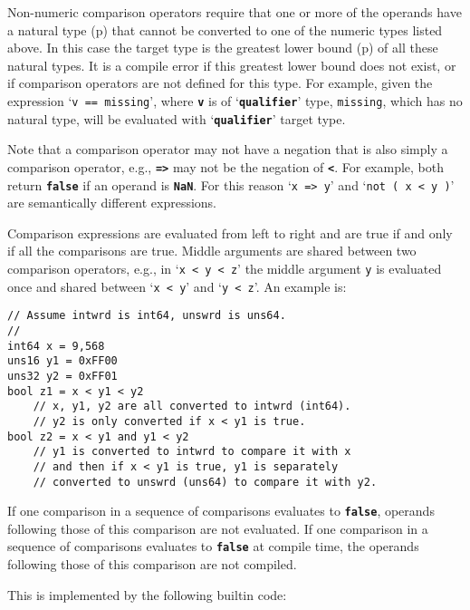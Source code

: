 \documentclass[12pt]{article}
\newcommand{\TT}[1]{{\tt \bfseries #1}}
\newcommand{\pagref}[1]{p\pageref{#1}}
\newenvironment{indpar}[1][0.3in]%
	{\begin{list}{}%
		     {\setlength{\itemsep}{0in}%
		      \setlength{\topsep}{0in}%
		      \setlength{\parsep}{1ex}%
		      \setlength{\labelwidth}{#1}%
		      \setlength{\leftmargin}{#1}%
		      \addtolength{\leftmargin}{\labelsep}}%
	 \item}%
	{\end{list}}
\begin{document}
Non-numeric comparison operators require that one or more of
the operands have a natural type (\pagref{NATURAL-TYPE}) that
cannot be converted to one of the numeric types listed above.
In this case the target type is
the greatest lower bound (\pagref{GREATEST-LOWER-BOUND})
of all these natural types.
It is a compile error if this greatest lower bound does
not exist, or if comparison operators are not defined for this
type.
For example, given the expression `{\tt v == missing}', where \TT{v}
is of `\TT{qualifier}' type, {\tt missing}, which has no natural type, will be
evaluated with `\TT{qualifier}' target type.

Note that a comparison operator may not have a negation that is
also simply a comparison operator, e.g., \TT{=>} may not be the
negation of \TT{<}.  For example, both return \TT{false} if an
operand is \TT{NaN}.  For this reason `{\tt x => y}' and
`{\tt not ( x < y )}' are semantically different expressions.

Comparison expressions are evaluated from left to right and are
true if and only if all the comparisons are true.  Middle
arguments are shared between two comparison operators, e.g.,
in `{\tt x < y < z}' the middle argument {\tt y} is evaluated
once and shared between `{\tt x < y}' and `{\tt y < z}'.
An example is:

\begin{indpar}\begin{verbatim}
// Assume intwrd is int64, unswrd is uns64.
//
int64 x = 9,568
uns16 y1 = 0xFF00
uns32 y2 = 0xFF01
bool z1 = x < y1 < y2
    // x, y1, y2 are all converted to intwrd (int64).
    // y2 is only converted if x < y1 is true.
bool z2 = x < y1 and y1 < y2
    // y1 is converted to intwrd to compare it with x
    // and then if x < y1 is true, y1 is separately
    // converted to unswrd (uns64) to compare it with y2.
\end{verbatim}\end{indpar}

If one comparison in a sequence of comparisons evaluates
to \TT{false}, operands following those of this comparison
are not evaluated.  If one comparison in a sequence of comparisons
evaluates to \TT{false} at compile time,
the operands following those of this comparison are not compiled.

This is implemented by the following builtin code:
\end{document}
